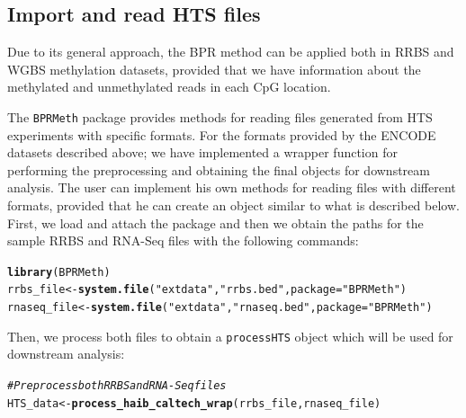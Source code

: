 \documentclass{article}\usepackage[]{graphicx}\usepackage[usenames,dvipsnames]{color}
\makeatletter
\newcommand{\hlstr}[1]{\textcolor[rgb]{0.192,0.494,0.8}{#1}}%
\newcommand{\hlcom}[1]{\textcolor[rgb]{0.678,0.584,0.686}{\textit{#1}}}%
\newcommand{\hlstd}[1]{\textcolor[rgb]{0.345,0.345,0.345}{#1}}%
\newcommand{\hlkwb}[1]{\textcolor[rgb]{0.69,0.353,0.396}{#1}}%
\newcommand{\hlkwc}[1]{\textcolor[rgb]{0.333,0.667,0.333}{#1}}%
\newcommand{\hlkwd}[1]{\textcolor[rgb]{0.737,0.353,0.396}{\textbf{#1}}}%
\newenvironment{kframe}{%
 \def\at@end@of@kframe{}%
 \ifinner\ifhmode%
  \def\at@end@of@kframe{\end{minipage}}%
  \begin{minipage}{\columnwidth}%
 \fi\fi%
 \def\FrameCommand##1{\hskip\@totalleftmargin \hskip-\fboxsep
 \colorbox{shadecolor}{##1}\hskip-\fboxsep
     \hskip-\linewidth \hskip-\@totalleftmargin \hskip\columnwidth}%
 \MakeFramed {\advance\hsize-\width
   \@totalleftmargin\z@ \linewidth\hsize
   \@setminipage}}%
 {\par\unskip\endMakeFramed%
 \at@end@of@kframe}
\makeatother
\begin{document}
\subsection{Import and read HTS files}
Due to its general approach, the BPR method can be applied both in RRBS and WGBS methylation datasets, provided that we have information about the methylated and unmethylated reads in each CpG location.

The \verb|BPRMeth| package provides methods for reading files generated from HTS experiments with specific formats. For the formats provided by the ENCODE datasets described above; we have implemented a wrapper function  for performing the preprocessing and obtaining the final objects for downstream analysis. The user can implement his own methods for reading files with different formats, provided that he can create an object similar to what is described below. First, we load and attach the package and then we obtain the paths for the sample RRBS and RNA-Seq files with the following commands:
\begin{kframe}
\begin{alltt}
\hlkwd{library}\hlstd{(BPRMeth)}
\hlstd{rrbs_file} \hlkwb{<-} \hlkwd{system.file}\hlstd{(}\hlstr{"extdata"}\hlstd{,} \hlstr{"rrbs.bed"}\hlstd{,} \hlkwc{package} \hlstd{=} \hlstr{"BPRMeth"}\hlstd{)}
\hlstd{rnaseq_file} \hlkwb{<-} \hlkwd{system.file}\hlstd{(}\hlstr{"extdata"}\hlstd{,} \hlstr{"rnaseq.bed"}\hlstd{,} \hlkwc{package} \hlstd{=} \hlstr{"BPRMeth"}\hlstd{)}
\end{alltt}
\end{kframe}

Then, we process both files to obtain a \verb|processHTS| object which will be used for downstream analysis:
\begin{kframe}
\begin{alltt}
\hlcom{# Preprocess both RRBS and RNA-Seq files}
\hlstd{HTS_data} \hlkwb{<-} \hlkwd{process_haib_caltech_wrap}\hlstd{(rrbs_file, rnaseq_file)}
\end{alltt}
\end{kframe}
\end{document}
